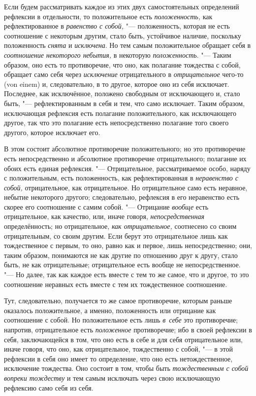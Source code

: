 Если будем рассматривать каждое из этих двух самостоятельных определений
рефлексии в отдельности, то положительное есть
{\em положенность,} как рефлектированное в
{\em равенство с собой,} "--- положенность, которая не
есть соотношение с некоторым другим, стало быть, устойчивое наличие,
поскольку положенность {\em снята} и
{\em исключена}. Но тем самым положительное обращает
себя в {\em соотношение некоторого небытия,} в
некоторую {\em положенность}. "--- Таким образом, оно есть
то противоречие, что оно, как полагание тождества с собой, обращает само
себя через {\em исключение} отрицательного в
{\em отрицательное} чего-то (von einem) и,
следовательно, в то другое, которое оно из себя исключает. Последнее, как
исключённое, положено свободным от исключающего и, стало быть, "---
рефлектированным в себя и тем, что само исключает. Таким образом,
исключающая рефлексия есть полагание положительного, как исключающего
другое, так что это полагание есть непосредственно полагание того своего
другого, которое исключает его.

В этом состоит абсолютное противоречие положительного; но это противоречие
есть непосредственно и абсолютное противоречие отрицательного; полагание их
обоих есть единая рефлексия. "--- Отрицательное, рассматриваемое особо, наряду
с положительным, есть положенность, как рефлектированная в
{\em неравенство с собой,} отрицательное, как
отрицательное. Но отрицательное само есть неравное, небытие некоторого
другого; следовательно, рефлексия в его неравенство есть скорее его
соотношение с самим собой. "--- Отрицание {\em вообще}
есть отрицательное, как качество, или, иначе говоря,
{\em непосредственная} определённость; но
отрицательное, {\em как отрицательное,} соотнесено со
своим отрицательным, со своим другим. Если берут это отрицательное лишь как
тождественное с первым, то оно, равно как и первое, лишь непосредственно;
они, таким образом, понимаются не как другие по отношению друг к другу,
стало быть, не как отрицательные; отрицательное есть вообще не
непосредственное. "--- Но далее, так как каждое есть вместе с тем то же самое,
что и другое, то это соотношение неравных есть вместе с тем их
тождественное соотношение.

Тут, следовательно, получается то же самое противоречие, которым раньше
оказалось положительное, а именно, положенность или отрицание как
соотношение с собой. Но положительное есть лишь {\em в~себе} это
противоречие; напротив, отрицательное есть
{\em положенное} противоречие; ибо в своей рефлексии в
себя, заключающейся в том, что оно есть в себе и для себя отрицательное
или, иначе говоря, что оно, как отрицательное, тождественно
с собой, "--- в этой рефлексии в себя оно имеет то определение, что оно есть
нетождественное, исключение тождества. Оно состоит в том, чтобы быть
{\em тождественным с собой вопреки тождеству} и тем
самым исключать через свою исключающую рефлексию само себя из себя.

